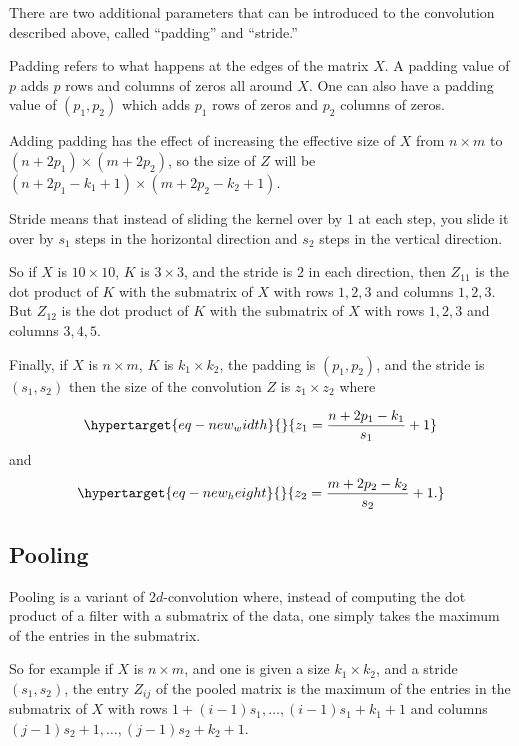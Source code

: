 \documentclass[
  11pt,
  letterpaper,
]{scrbook}
\theoremstyle{plain}
\theoremstyle{remark}
\begin{document}
There are two additional parameters that can be introduced to the
convolution described above, called ``padding'' and ``stride.''

Padding refers to what happens at the edges of the matrix \(X\). A
padding value of \(p\) adds \(p\) rows and columns of zeros all around
\(X\). One can also have a padding value of \((p_1,p_2)\) which adds
\(p_1\) rows of zeros and \(p_2\) columns of zeros.

Adding padding has the effect of increasing the effective size of \(X\)
from \(n\times m\) to \((n+2p_1)\times (m+2p_2)\), so the size of \(Z\)
will be \((n+2p_1-k_1+1)\times (m+2p_2-k_2+1).\)

Stride means that instead of sliding the kernel over by \(1\) at each
step, you slide it over by \(s_1\) steps in the horizontal direction and
\(s_2\) steps in the vertical direction.

So if \(X\) is \(10\times 10\), \(K\) is \(3\times 3\), and the stride
is \(2\) in each direction, then \(Z_{11}\) is the dot product of \(K\)
with the submatrix of \(X\) with rows \(1,2,3\) and columns \(1,2,3\).
But \(Z_{12}\) is the dot product of \(K\) with the submatrix of \(X\)
with rows \(1,2,3\) and columns \(3,4,5\).

Finally, if \(X\) is \(n\times m\), \(K\) is \(k_1\times k_2\), the
padding is \((p_1,p_2)\), and the stride is \((s_1,s_2)\) then the size
of the convolution \(Z\) is \(z_1\times z_2\) where

\begin{equation}\protect\hypertarget{eq-new_width}{}{
z_1=\frac{n+2p_1-k_1}{s_1}+1
}\label{eq-new_width}\end{equation} and
\begin{equation}\protect\hypertarget{eq-new_height}{}{
z_2 = \frac{m+2p_2-k_2}{s_2}+1.
}\label{eq-new_height}\end{equation}

\hypertarget{pooling}{%
\subsection{Pooling}\label{pooling}}

Pooling is a variant of \(2d\)-convolution where, instead of computing
the dot product of a filter with a submatrix of the data, one simply
takes the maximum of the entries in the submatrix.

So for example if \(X\) is \(n\times m\), and one is given a size
\(k_1\times k_2\), and a stride \((s_1,s_2)\), the entry \(Z_{ij}\) of
the pooled matrix is the maximum of the entries in the submatrix of
\(X\) with rows \(1+(i-1)s_1,\ldots, (i-1)s_1+k_1+1\) and columns
\((j-1)s_2+1,\ldots, (j-1)s_2+k_2+1\).
\end{document}
